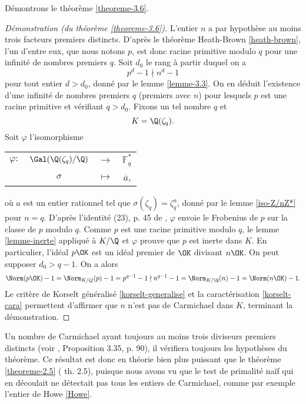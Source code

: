 Démontrons le théorème \ref{theoreme-3.6}.

\begin{proof}[Démonstration (du théorème \ref{theoreme-3.6})]
	L'entier $n$ a par hypothèse au moins trois facteurs premiers distincts. D'après le théorème Heath-Brown \ref{heath-brown}, l'un d'entre eux, que nous notons $p$, est donc racine primitive modulo $q$ pour une infinité de nombres premiers $q$. Soit $d_0$ le rang à partir duquel on a \[p^d - 1 \nmid n^d - 1\] pour tout entier $d>d_0$, donné par le lemme \ref{lemme-3.3}. On en déduit l'existence d'une infinité de nombres premiers $q$ (premiers avec $n$) pour lesquels $p$ est une racine primitive et vérifiant $q>d_0$. Fixons un tel nombre $q$ et \[K = \Q(\zeta_q).\] Soit $\varphi$ l'isomorphisme
\begin{center}
	\begin{tabular}{cccc}
		$\varphi :$ & $\Gal(\Q(\zeta_q)/\Q)$ & $\longrightarrow$ & $\mathbb{F}_q^*$ \\
		&$\sigma$	& $\longmapsto$ & $\overline{a}$,
	\end{tabular}
\end{center}
où $a$ est un entier rationnel tel que $\sigma(\zeta_q) = \zeta_q^a$, donné par le lemme \ref{iso-Z/nZ*} pour $n=q$. D'après l'identité (23), p. 45 de \cite{Kraus}, $\varphi$ envoie le Frobenius de $p$ sur la classe de $p$ modulo $q$. Comme $p$ est une racine primitive modulo $q$, le lemme \ref{lemme-inerte} appliqué à $K/\Q$ et $\varphi$ prouve que $p$ est inerte dans $K$. En particulier, l'idéal $p\OK$ est un idéal premier de $\OK$ divisant $n\OK$. On peut supposer $d_0 > q-1$. On a alors \[ \Norm(p\OK) - 1 = \Norm_{K/Q}(p) - 1 = p^{q-1} - 1 \nmid n^{q-1} - 1 = \Norm_{K/\Q}(n) - 1 = \Norm(n\OK) - 1.\] Le critère de Korselt généralisé \ref{korselt-generalise} et la caractérisation \ref{korselt-cara} permettent d'affirmer que $n$ n'est pas de Carmichael dans $K$, terminant la démonstration.

\end{proof}

Un nombre de Carmichael ayant toujours au moins trois diviseurs premiers distincts (voir \cite{Demazure}, Proposition 3.35, p. 90), il vérifiera toujours les hypothèses du théorème. Ce résultat est donc en théorie bien plus puissant que le théorème \ref{theoreme-2.5} (\cite{article} th. 2.5), puisque nous avons vu que le test de primalité naïf qui en découlait ne détectait pas tous les entiers de Carmichael, comme par exemple l'entier de Howe \ref{Howe}. 

